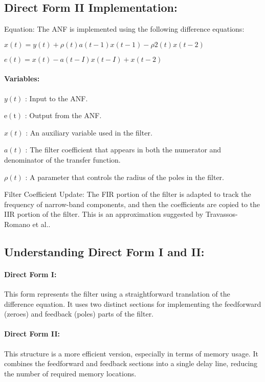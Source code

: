 \subsection{Direct Form II Implementation:}

Equation: The ANF is implemented using the following difference equations:

$x(t)=y(t)+\rho(t) a(t-1) x(t-1)-\rho 2(t) x(t-2)$

$e(t)=x(t)-a(t-I) x(t-I)+x(t-2)$

\paragraph{Variables:}

$y(t)$ : Input to the ANF.

$\mathrm{e}(\mathrm{t})$ : Output from the ANF.

$x(t)$ : An auxiliary variable used in the filter.

$a(t)$ : The filter coefficient that appears in both the numerator and denominator of the transfer function.

$\rho(t)$ : A parameter that controls the radius of the poles in the filter.

Filter Coefficient Update: The FIR portion of the filter is adapted to track the frequency of narrow-band components, and then the coefficients are copied to the IIR portion of the filter. This is an approximation suggested by Travassos-Romano et al..

\subsection{Understanding Direct Form I and II:}

\paragraph{Direct Form I:} This form represents the filter using a straightforward translation of the difference equation. It uses two distinct sections for implementing the feedforward (zeroes) and feedback (poles) parts of the filter.

\paragraph{Direct Form II:} This structure is a more efficient version, especially in terms of memory usage. It combines the feedforward and feedback sections into a single delay line, reducing the number of required memory locations.

